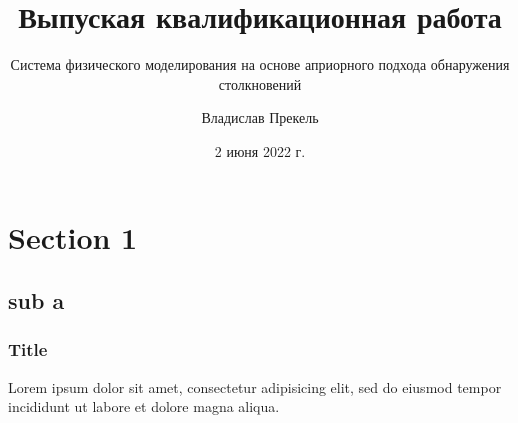 \documentclass[xetex]{beamer}
\title{Выпуская квалификационная работа}
\subtitle{Система физического моделирования на основе априорного подхода обнаружения столкновений}
\author{Владислав Прекель}
\institute{ИКИТ СФУ\\КИ18-16б}
\date{2 июня 2022 г.}
\begin{document}
\begin{frame}
    \titlepage
\end{frame}

\section{Section 1}
\subsection{sub a}

\begin{frame}
    \frametitle{Title}
    Lorem ipsum dolor sit amet, consectetur adipisicing elit, sed do eiusmod tempor incididunt ut labore et dolore magna aliqua.
\end{frame}
\end{document}
